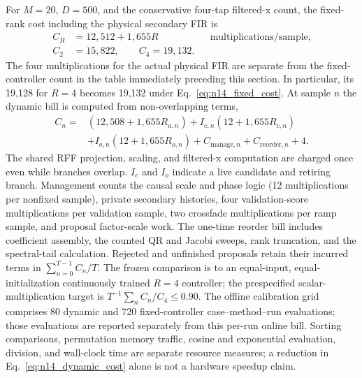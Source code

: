 For $M=20$, $D=500$, and the conservative four-tap filtered-x count, the
fixed-rank cost including the physical secondary FIR is
\begin{equation}
 \begin{aligned}
 C_R&=12{,}512+1{,}655R
       &&\text{multiplications/sample},\\
 C_2&=15{,}822,\qquad C_4=19{,}132.
 \end{aligned}
 \label{eq:n14_fixed_cost}
\end{equation}
The four multiplications for the actual physical FIR are separate from
the fixed-controller count in the table immediately preceding this
section.  In particular, its 19{,}128 for $R=4$ becomes
19{,}132 under Eq.~\eqref{eq:n14_fixed_cost}.  At sample $n$ the dynamic
bill is computed from non-overlapping terms,
\begin{equation}
 \begin{aligned}
 C_n={}&(12{,}508+1{,}655R_{a,n})
       +I_{c,n}(12+1{,}655R_{c,n})\\
      &+I_{o,n}(12+1{,}655R_{o,n})
       +C_{\mathrm{manage},n}+C_{\mathrm{reorder},n}+4.
 \end{aligned}
 \label{eq:n14_dynamic_cost}
\end{equation}
The shared RFF projection, scaling, and filtered-x computation are charged
once even while branches overlap.  $I_c$ and $I_o$ indicate a live
candidate and retiring branch.  Management counts the causal scale and
phase logic (12 multiplications per nonfixed sample), private secondary
histories, four validation-score multiplications per validation sample,
two crossfade multiplications per ramp sample, and proposal factor-scale
work.  The one-time reorder bill includes coefficient assembly, the
counted QR and Jacobi sweeps, rank truncation, and the spectral-tail
calculation.  Rejected and unfinished proposals retain their incurred
terms in $\sum_{n=0}^{T-1}C_n/T$.  The frozen comparison is to an
equal-input, equal-initialization continuously trained $R=4$ controller;
the prespecified scalar-multiplication target is
$T^{-1}\sum_n C_n/C_4\leq 0.90$.  The offline calibration grid comprises
80 dynamic and 720 fixed-controller case--method--run evaluations; those
evaluations are reported separately from this per-run online bill.
Sorting comparisons, permutation memory
traffic, cosine and exponential evaluation, division, and wall-clock time
are separate resource measures; a reduction in Eq.~\eqref{eq:n14_dynamic_cost}
alone is not a hardware speedup claim.

